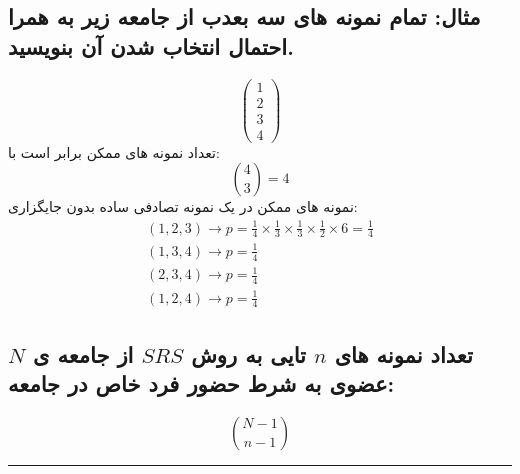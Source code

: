 \subsection*{مثال: تمام نمونه های سه بعدب از جامعه زیر به همرا احتمال انتخاب شدن آن بنویسید.}
\begin{equation*}
	\begin{pmatrix}
		1 \\
		2 \\
		3 \\
		4
	\end{pmatrix}
\end{equation*}
تعداد نمونه های ممکن برابر است با:
\begin{equation*}
	\binom{4}{3}=4
\end{equation*}
نمونه های ممکن در یک نمونه تصادفی ساده بدون جایگزاری:
\begin{gather*}
	(1,2,3) \rightarrow p=\frac{1}{4}\times\frac{1}{3}\times\frac{1}{3}\times\frac{1}{2}\times 6
	=\frac{1}{4} \\
	(1,3,4) \rightarrow p=\frac{1}{4} \\
	(2,3,4) \rightarrow p=\frac{1}{4} \\
	(1,2,4) \rightarrow p=\frac{1}{4}
\end{gather*}
\subsection*{تعداد نمونه های 
	$n$
	تایی به روش
	$SRS$
	از جامعه ی 
	$N$ 
	عضوی به شرط حضور فرد خاص در جامعه:
}
\begin{equation*}
	\binom{N-1}{n-1}
\end{equation*}
\rule{\textwidth}{0.4pt}
